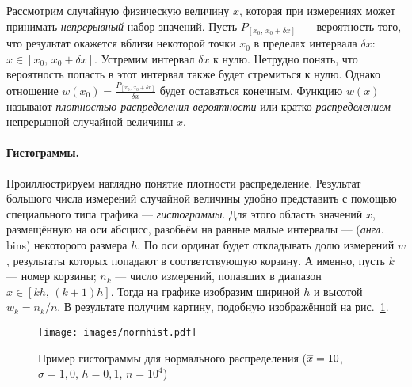 Рассмотрим случайную физическую величину $x$, которая при измерениях может
принимать \emph{непрерывный} набор значений. Пусть
$P_{[x_0,\,x_0+\delta x]}$~--- вероятность того, что результат окажется вблизи
некоторой точки $x_0$ в пределах интервала $\delta x$: $x\in [x_0,\,x_0+\delta x]$.
Устремим интервал
$\delta x$ к нулю. Нетрудно понять, что вероятность попасть в этот интервал
также будет стремиться к нулю. Однако отношение
$w(x_0) = \frac{P_{[x_0,\,x_0+\delta x]}}{\delta x}$ будет оставаться конечным.
Функцию $w(x)$ называют \emph{плотностью распределения вероятности} или кратко
\emph{распределением} непрерывной случайной величины $x$.



\paragraph{Гистограммы.}
Проиллюстрируем наглядно понятие плотности распределение. Результат
большого числа измерений случайной величины удобно представить с помощью
специального типа графика --- \emph{гистограммы}.
Для этого область значений $x$, размещённую на оси абсцисс, разобьём на
равные малые интервалы ---  (\emph{англ.} bins)
некоторого размера $h$. По оси ординат будет откладывать долю измерений $w$,
результаты которых попадают в соответствующую корзину. А именно,
пусть $k$ --- номер корзины; $n_k$ --- число измерений, попавших
в диапазон $x\in [kh,\,(k+1)h]$. Тогда  на графике изобразим 
шириной $h$ и высотой $w_{k}=n_{k}/n$.
В результате получим картину, подобную изображённой на рис.~\ref{fig:normhist}.

\begin{figure}[ht!]
    \centering
    \texttt{[image: images/normhist.pdf]}
    \caption{Пример гистограммы для нормального распределения ($\overline{x}=10$,
$\sigma=1{,}0$, $h=0{,}1$, $n=10^{4}$)}\label{fig:normhist}
\end{figure}

